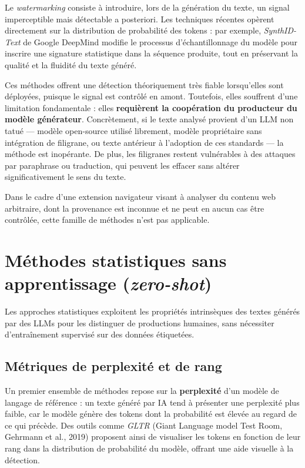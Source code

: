 ﻿\documentclass[12pt, a4paper]{report}
\begin{document}
Le \textit{watermarking} consiste à introduire, lors de la génération du texte, 
un signal imperceptible mais détectable a posteriori. Les techniques récentes 
opèrent directement sur la distribution de probabilité des tokens : par exemple, 
\textit{SynthID-Text} de Google DeepMind modifie le processus d'échantillonnage 
du modèle pour inscrire une signature statistique dans la séquence produite, 
tout en préservant la qualité et la fluidité du texte généré.

Ces méthodes offrent une détection théoriquement très fiable lorsqu'elles sont 
déployées, puisque le signal est contrôlé en amont. Toutefois, elles souffrent 
d'une limitation fondamentale : elles \textbf{requièrent la coopération du 
producteur du modèle générateur}. Concrètement, si le texte analysé provient 
d'un LLM non tatué — modèle open-source utilisé librement, modèle propriétaire 
sans intégration de filigrane, ou texte antérieur à l'adoption de ces standards 
— la méthode est inopérante. De plus, les filigranes restent vulnérables à des 
attaques par paraphrase ou traduction, qui peuvent les effacer sans altérer 
significativement le sens du texte.

Dans le cadre d'une extension navigateur visant à analyser du contenu web 
arbitraire, dont la provenance est inconnue et ne peut en aucun cas être 
contrôlée, cette famille de méthodes n'est pas applicable.

\section{Méthodes statistiques sans apprentissage (\textit{zero-shot})}

Les approches statistiques exploitent les propriétés intrinsèques des textes 
générés par des LLMs pour les distinguer de productions humaines, sans nécessiter 
d'entraînement supervisé sur des données étiquetées.

\subsection{Métriques de perplexité et de rang}

Un premier ensemble de méthodes repose sur la \textbf{perplexité} d'un modèle de 
langage de référence : un texte généré par IA tend à présenter une perplexité plus 
faible, car le modèle génère des tokens dont la probabilité est élevée au regard 
de ce qui précède. Des outils comme \textit{GLTR} (Giant Language model Test Room, 
Gehrmann et al., 2019) proposent ainsi de visualiser les tokens en fonction de 
leur rang dans la distribution de probabilité du modèle, offrant une aide visuelle 
à la détection.
\end{document}
